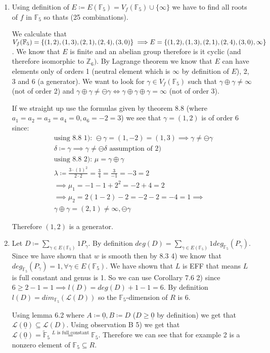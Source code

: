 \documentclass[12pt, a4paper]{article}
\begin{document}
\begin{enumerate}[label=(\alph*)]
\item Using definition of $E \coloneqq E(\mathbb{F}_5) = V_f(\mathbb{F}_5) \cup \{\infty\}$ we have to find all roots of $f$ in $\mathbb{F}_5$ so thats (25 combinations). 

We calculate that $V_f(\mathbb{F}_5) = \{(1,2),(1,3),(2,1),(2,4),(3,0)\} \implies \\E = \{(1,2),(1,3),(2,1),(2,4),(3,0),\infty\}$. We know that $E$ is finite and an abelian group therefore is it cyclic (and therefore isomorphic to $\mathbb{Z}_6)$. By Lagrange theorem  we know that $E$ can have elements only of orders 1 (neutral element which is $\infty$ by definition of $E$), 2, 3 and 6 (a generator). We want to look for $\gamma \in V_f(\mathbb{F}_5)$ such that $\gamma \oplus \gamma \neq \infty$ (not of order 2) and $\gamma \oplus \gamma \neq \ominus \gamma \iff \gamma \oplus \gamma \oplus \gamma = \infty$ (not of order 3).

If we straight up use the formulas given by theorem 8.8 (where $a_1=a_2=a_3=a_4 = 0, a_6 = -2=3$)  we see that $\gamma = (1,2)$ is of order 6 since:
\begin{gather*}
\text{using 8.8 1): }\ominus \gamma = (1, -2) = (1,3) \implies  \gamma \neq \ominus \gamma\\
\delta \coloneqq \gamma \implies \gamma \neq \ominus \delta \text{ assumption of 2)}\\
\text{using 8.8 2): } \mu = \gamma \oplus \gamma\\
\lambda \coloneqq \frac{3 \cdot (1)^2}{2 \cdot 2} = \frac{3}{4} = \frac{3}{-1} = -3 = 2\\
\implies \mu_1 = -1-1+2^2 = -2+4 = 2 \\
\implies \mu_2 = 2(1-2)-2 = -2 - 2 = - 4 = 1 \implies\\
\gamma \oplus \gamma = (2,1) \neq \infty,\ominus \gamma
\end{gather*}

Therefore $(1,2)$ is a generator.

\item Let $D \coloneqq \sum_{\gamma \in E(\mathbb{F}_5)} 1P_\gamma$. By definition $deg(D) = \sum_{\gamma \in E(\mathbb{F}_5)}1 deg_{\mathbb{F}_5}(P_\gamma)$. Since we have shown that $w$ is smooth then by 8.3 4) we know that $deg_{\mathbb{F}_5}(P_\gamma) = 1, \forall \gamma \in E(\mathbb{F}_5)$. We have shown that $L$ is EFF that means $L$ is full constant and genus is 1. So we can use Corollary 7.6 2) since $6 \geq 2 - 1 = 1 \implies l(D) = deg(D) + 1 - 1 = 6$. By definition $l(D) = dim_{\mathbb{F}_5}(\mathcal{L}(D))$ so the $\mathbb{F}_5$-dimension of $R$ is 6.

Using lemma 6.2 where $A \coloneqq \underline{0}, B \coloneqq D$ ($D \geq \underline{0}$ by definition) we get that $\mathcal{L}(\underline{0}) \subseteq \mathcal{L}(D)$. Using observation B 5) we get that $\mathcal{L}(\underline{0}) = \tilde{\mathbb{F}}_5 \stackrel{L\text{ is full constant}}{=} \mathbb{F}_5$. Therefore we can see that for example 2 is a nonzero element of $\mathbb{F}_5 \subseteq R$.

\end{enumerate}
\end{document}
